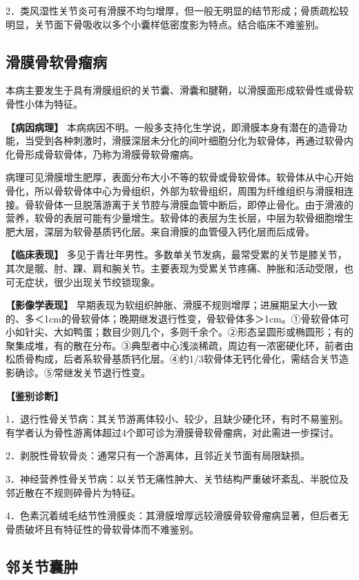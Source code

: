 2．类风湿性关节炎可有滑膜不均匀增厚，但一般无明显的结节形成；骨质疏松较明显，关节面下骨吸收以多个小囊样低密度影为特点。结合临床不难鉴别。

\subsection{滑膜骨软骨瘤病}

本病主要发生于具有滑膜组织的关节囊、滑囊和腱鞘，以滑膜面形成软骨性或骨软骨性小体为特征。

\textbf{【病因病理】}
本病病因不明。一般多支持化生学说，即滑膜本身有潜在的造骨功能，当受到各种刺激时，滑膜深层未分化的间叶细胞分化为软骨体，再通过软骨内化骨形成骨软骨体，乃称为滑膜骨软骨瘤病。

病理可见滑膜增生肥厚，表面分布大小不等的软骨或骨软骨体。软骨体从中心开始骨化，所以骨软骨体中心为骨组织，外部为软骨组织，周围为纤维组织与滑膜相连接。骨软骨体一旦脱落游离于关节腔与滑膜血管中断后，即停止骨化。由于滑液的营养，软骨的表层可能有少量增生。软骨体的表层为生长层，中层为软骨细胞增生肥大层，深层为软骨基质钙化层。来自滑膜的血管侵入钙化层而后成骨。

\textbf{【临床表现】}
多见于青壮年男性。多数单关节发病，最常受累的关节是膝关节，其次是髋、肘、踝、肩和腕关节。主要表现为受累关节疼痛、肿胀和活动受限，也可无症状，很少出现关节绞锁现象。

\textbf{【影像学表现】}
早期表现为软组织肿胀、滑膜不规则增厚；进展期呈大小一致的、多＜1cm的骨软骨体；晚期继发退行性变，骨软骨体多＞1cm。①骨软骨体可小如针尖、大如鸭蛋；数目少则几个，多则千余个。②形态呈圆形或椭圆形；有的聚集成堆，有的散在分布。③典型者中心浅淡稀疏，周边有一浓密硬化环，前者由松质骨构成，后者系软骨基质钙化层。④约1/3软骨体无钙化骨化，需结合关节造影确诊。⑤常继发关节退行性变。

\textbf{【鉴别诊断】}

1．退行性骨关节病：其关节游离体较小、较少，且缺少硬化环，有时不易鉴别。有学者认为骨性游离体超过4个即可诊为滑膜骨软骨瘤病，对此需进一步探讨。

2．剥脱性骨软骨炎：通常只有一个游离体，且邻近关节面有局限缺损。

3．神经营养性骨关节病：以关节无痛性肿大、关节结构严重破坏紊乱、半脱位及邻近散在不规则碎骨片为特征。

4．色素沉着绒毛结节性滑膜炎：其滑膜增厚远较滑膜骨软骨瘤病显著，但后者无骨质破坏且有特征性的骨软骨体而不难鉴别。

\subsection{邻关节囊肿}

